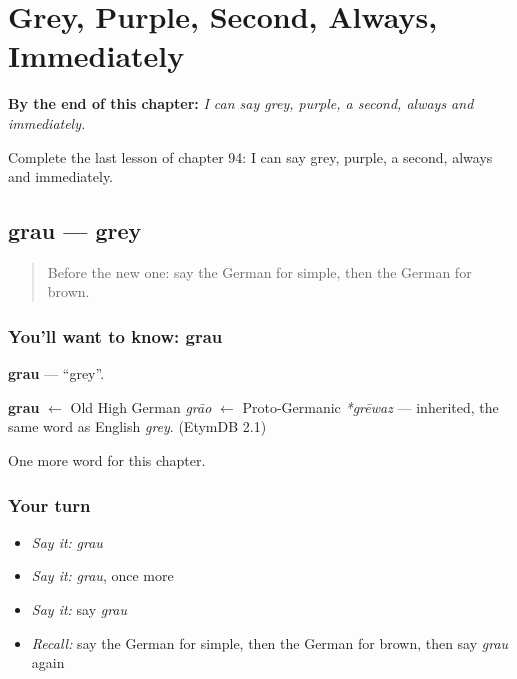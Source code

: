 
\chapter{Grey, Purple, Second, Always, Immediately}
\label{ch:ge-grey-purple-second-always-immediately}

\begin{chapteropening}
\textbf{By the end of this chapter:} \emph{I can say grey, purple, a second, always and immediately.}

Complete the last lesson of chapter 94: I can say grey, purple, a second, always and immediately.
\end{chapteropening}

\section[grau]{grau — grey}

\label{lesson:GE-C94-grau}



\begin{quote}
Before the new one: say the German for simple, then the German for brown.
\end{quote}

\subsection*{You'll want to know: grau}
\textbf{grau} — \textquotedblleft{}grey\textquotedblright{}.

\begin{cousinweb}
\textbf{grau} $\leftarrow$ Old High German \emph{grāo} $\leftarrow$ Proto-Germanic \emph{*grēwaz} — inherited, the same word as English \emph{grey}. (EtymDB 2.1)
\end{cousinweb}

\begin{grammarlens}[title={What you've built}]
One more word for this chapter.
\end{grammarlens}

\subsection*{Your turn}
\begin{itemize}
\raggedright
  \item \emph{Say it:} \emph{grau}
  \item \emph{Say it:} \emph{grau}, once more
  \item \emph{Say it:} say \emph{grau}
  \item \emph{Recall:} say the German for simple, then the German for brown, then say \emph{grau} again
\end{itemize}

